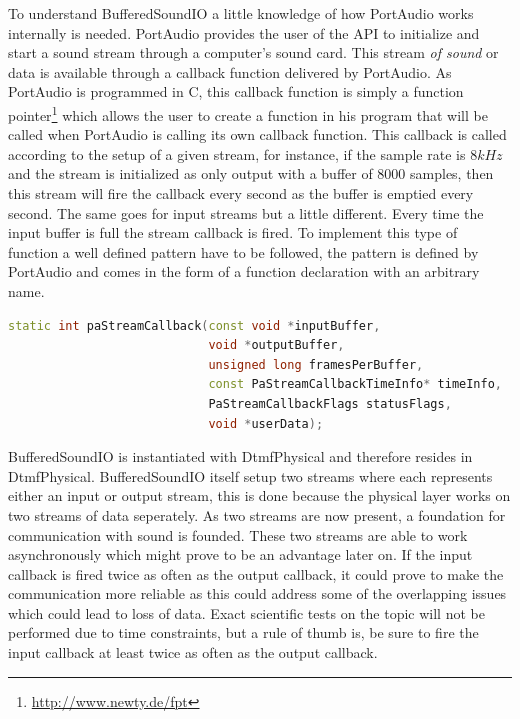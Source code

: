 	To understand BufferedSoundIO a little knowledge of how PortAudio works internally is needed. PortAudio provides the user of the API to initialize
	and start a sound stream through a computer's sound card. This stream \textit{of sound} or data is available through a callback function delivered
	by PortAudio. As PortAudio is programmed in C, this callback function is simply a function pointer\footnote{\url{http://www.newty.de/fpt}}
	which allows the user to create a function in his program that will be called when PortAudio is calling its own callback function.
	This callback is called according to the setup of a given stream, for instance, if the sample rate is $8kHz$ and the stream is initialized as 
	only output with a buffer of 8000 samples, then this stream will fire the callback every second as the buffer is emptied every second.
	The same goes for input streams but a little different. Every time the input buffer is full the stream callback is fired. To implement
	this type of function a well defined pattern have to be followed, the pattern is defined by PortAudio and comes in the form of a
	function declaration with an arbitrary name. 
	
	\begin{lstlisting}[float=htb,language={C++},caption={PortAudios callback function declaration. This declaration is used for both input
	streams, output streams, and the two in combination.},label={lst:pa_callback}]
static int paStreamCallback(const void *inputBuffer,
							void *outputBuffer,
							unsigned long framesPerBuffer,
							const PaStreamCallbackTimeInfo* timeInfo,
							PaStreamCallbackFlags statusFlags,
							void *userData);
	\end{lstlisting}
	
	BufferedSoundIO is instantiated with DtmfPhysical and therefore resides in DtmfPhysical. BufferedSoundIO itself setup two streams where each
	represents either an input or output stream, this is done because the physical layer works on two streams of data seperately. As two streams are 
	now present, a foundation for communication with sound is founded. These two streams are able to work asynchronously which might prove to be an
	advantage later on. If the input callback is fired twice as often as the output callback, it could prove to make the communication more reliable
	as this could address some of the overlapping issues which could lead to loss of data. Exact scientific tests on the topic will not be performed
	due to time constraints, but a rule of thumb is, be sure to fire the input callback at least twice as often as the output callback.
	
